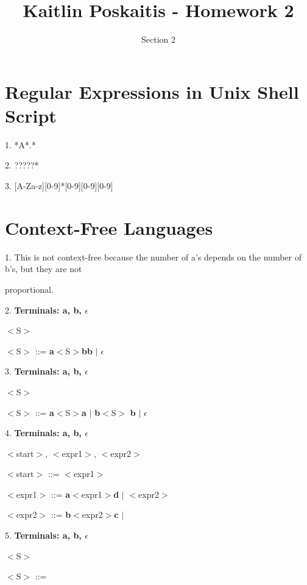 \documentclass[11pt]{article}
\title{\bf Kaitlin Poskaitis - Homework 2}
\author{Section 2}
\date{}
\begin{document}
\maketitle

\section{Regular Expressions in Unix Shell Script}
1. *A*.*

2. ?????*

3. [A-Za-z][0-9]*[0-9][0-9][0-9]

\section{Context-Free Languages}
1. This is not context-free because the number of a's depends on the number of 
b's, but they are not

proportional.

\vspace{5mm}

2. {\bf Terminals: a, b, $\epsilon$}
	
	 $<$S$>$

		
		\indent\indent $<$S$>$ ::= {\bf a}$<$S$>${\bf bb} $|$ {\bf $\epsilon$}

\vspace{5mm}

3. {\bf Terminals: a, b, $\epsilon$}

	 $<$S$>$


		\indent\indent $<$S$>$ ::= {\bf a}$<$S$>${\bf a} $|$ {\bf b}$<$S$>$
		{\bf b} $|$ $\epsilon$

\vspace{5mm}

4. {\bf Terminals: a, b, $\epsilon$}

	 $<$start$>$, $<$expr1$>$, $<$expr2$>$


		\indent\indent $<$start$>$ ::= $<$expr1$>$

		\indent\indent $<$expr1$>$ ::= {\bf a}$<$expr1$>${\bf d} $|$ $<$expr2$>$

		\indent\indent $<$expr2$>$ ::= {\bf b}$<$expr2$>${\bf c} $|$ 
		{\bf \epsilon}

5. {\bf Terminals: a, b, $\epsilon$}

	 $<$S$>$


	\indent\indent $<$S$>$ ::= 
\end{document}
